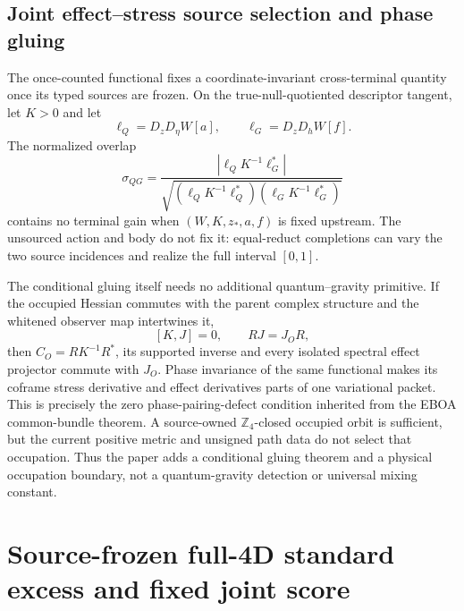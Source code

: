 \documentclass[11pt]{article}
\begin{document}
\subsection*{Joint effect--stress source selection and phase gluing}

The once-counted functional fixes a coordinate-invariant cross-terminal
quantity once its typed sources are frozen.  On the true-null-quotiented
descriptor tangent, let $K>0$ and let
\[
 \ell_Q=D_zD_\eta W[a],\qquad
 \ell_G=D_zD_h W[f].
\]
The normalized overlap
\[
 \sigma_{QG}=
 \frac{|\ell_QK^{-1}\ell_G^*|}
 {\sqrt{(\ell_QK^{-1}\ell_Q^*)(\ell_GK^{-1}\ell_G^*)}}
\]
contains no terminal gain when $(W,K,z_*,a,f)$ is fixed upstream.  The
unsourced action and body do not fix it: equal-reduct completions can vary the
two source incidences and realize the full interval $[0,1]$.

The conditional gluing itself needs no additional quantum--gravity
primitive.  If the occupied Hessian commutes with the parent complex
structure and the whitened observer map intertwines it,
\[
 [K,J]=0,\qquad RJ=J_OR,
\]
then $C_O=RK^{-1}R^*$, its supported inverse and every isolated spectral
effect projector commute with $J_O$.  Phase invariance of the same functional
makes its coframe stress derivative and effect derivatives parts of one
variational packet.  This is precisely the zero phase-pairing-defect
condition inherited from the EBOA common-bundle theorem.  A source-owned
$\mathbb Z_4$-closed occupied orbit is sufficient, but the current positive
metric and unsigned path data do not select that occupation.  Thus the paper
adds a conditional gluing theorem and a physical occupation boundary, not a
quantum-gravity detection or universal mixing constant.

\section{Source-frozen full-4D standard excess and fixed joint score}
\end{document}
